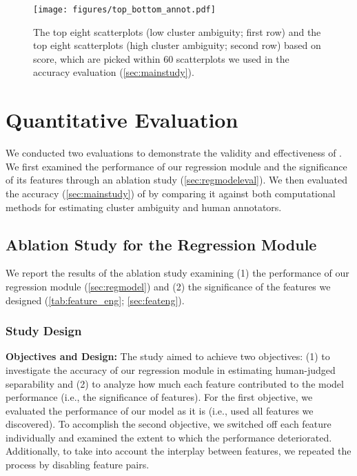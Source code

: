 \begin{figure*}
    \centering
    \texttt{[image: figures/top\_bottom\_annot.pdf]}
    \vspace{-5mm}
    \caption{The top eight  scatterplots (low cluster ambiguity; first row) and the top eight  scatterplots (high cluster ambiguity; second row) based on \measure score, which are picked within 60 scatterplots we used in the accuracy evaluation (\autoref{sec:mainstudy}). \vspace{-4mm}}
    \label{fig:topbottom}
\end{figure*}

\section{Quantitative Evaluation}

We conducted two evaluations to demonstrate the validity and effectiveness of \measure. We first  examined the performance of our regression module and the significance of its features through an ablation study (\autoref{sec:regmodeleval}). We then evaluated the accuracy (\autoref{sec:mainstudy}) of \measure by comparing it against both computational methods for estimating cluster ambiguity and human annotators. 

\subsection{Ablation Study for the Regression Module}

\label{sec:regmodeleval}

We report the results of the ablation study examining (1) the performance of our regression module (\autoref{sec:regmodel}) and (2) the significance of the features we designed (\autoref{tab:feature_eng}; \autoref{sec:feateng}).

\subsubsection{Study Design}

\textbf{Objectives and Design:}
The study aimed to achieve two objectives: (1) to investigate the accuracy of our regression module in estimating human-judged separability and (2) to analyze 
how much each feature contributed to the model performance (i.e., the significance of features). 
For the first objective, we evaluated the performance of our model as it is (i.e., used all features we discovered). To accomplish the second objective, we switched off each feature individually and examined the extent to which the performance deteriorated. Additionally, to take into account the interplay between features, we repeated the process by disabling feature pairs. 



